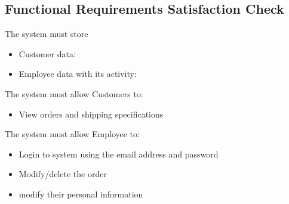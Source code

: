\subsection{Functional Requirements Satisfaction Check}

The system must store
\begin{itemize}
	\item Customer data:
\end{itemize}
\begin{itemize}
	\item Employee data with its activity:
\end{itemize}

The system must allow Customers to:
\begin{itemize}
	\item View orders and shipping specifications
\end{itemize}

The system must allow Employee to:
\begin{itemize}
	\item Login to system using the email address and password
	\item Modify/delete the order
	\item modify their personal information
\end{itemize}
